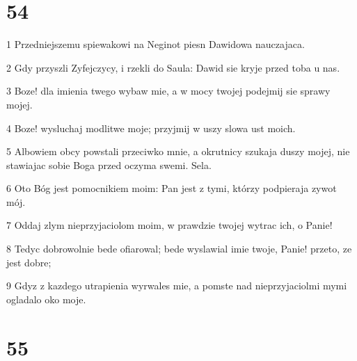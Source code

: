 \chapter{54}

\par 1 Przedniejszemu spiewakowi na Neginot piesn Dawidowa nauczajaca.
\par 2 Gdy przyszli Zyfejczycy, i rzekli do Saula: Dawid sie kryje przed toba u nas.
\par 3 Boze! dla imienia twego wybaw mie, a w mocy twojej podejmij sie sprawy mojej.
\par 4 Boze! wysluchaj modlitwe moje; przyjmij w uszy slowa ust moich.
\par 5 Albowiem obcy powstali przeciwko mnie, a okrutnicy szukaja duszy mojej, nie stawiajac sobie Boga przed oczyma swemi. Sela.
\par 6 Oto Bóg jest pomocnikiem moim: Pan jest z tymi, którzy podpieraja zywot mój.
\par 7 Oddaj zlym nieprzyjaciolom moim, w prawdzie twojej wytrac ich, o Panie!
\par 8 Tedyc dobrowolnie bede ofiarowal; bede wyslawial imie twoje, Panie! przeto, ze jest dobre;
\par 9 Gdyz z kazdego utrapienia wyrwales mie, a pomste nad nieprzyjaciolmi mymi ogladalo oko moje.

\chapter{55}

